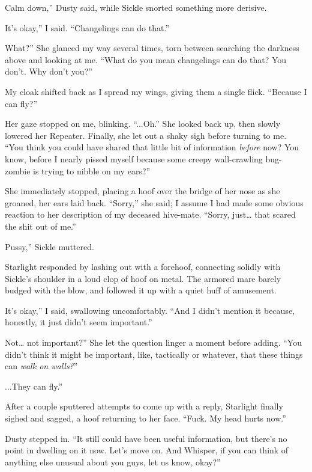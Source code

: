 \leavevmode{}Calm down,” Dusty said, while Sickle snorted something more derisive.

\leavevmode{}It’s okay,” I said. “Changelings can do that.”

\leavevmode{}What?” She glanced my way several times, torn between searching the darkness above and looking at me. “What do you mean changelings can do that? You don’t. Why don’t you?”

My cloak shifted back as I spread my wings, giving them a single flick. “Because I can fly?”

Her gaze stopped on me, blinking. “...Oh.” She looked back up, then slowly lowered her Repeater. Finally, she let out a shaky sigh before turning to me. “You think you could have shared that little bit of information \textit{before} now? You know, before I nearly pissed myself because some creepy wall-crawling bug-zombie is trying to nibble on my ears?”

She immediately stopped, placing a hoof over the bridge of her nose as she groaned, her ears laid back. “Sorry,” she said; I assume I had made some obvious reaction to her description of my deceased hive-mate. “Sorry, just… that scared the shit out of me.”

\leavevmode{}Pussy,” Sickle muttered.

Starlight responded by lashing out with a forehoof, connecting solidly with Sickle’s shoulder in a loud clop of hoof on metal. The armored mare barely budged with the blow, and followed it up with a quiet huff of amusement.

\leavevmode{}It’s okay,” I said, swallowing uncomfortably. “And I didn’t mention it because, honestly, it just didn’t seem important.”

\leavevmode{}Not… not important?” She let the question linger a moment before adding. “You didn’t think it might be important, like, tactically or whatever, that these things can \textit{walk on walls?}”

\leavevmode{}...They can fly.”

After a couple sputtered attempts to come up with a reply, Starlight finally sighed and sagged, a hoof returning to her face. “Fuck. My head hurts now.”

Dusty stepped in. “It still could have been useful information, but there’s no point in dwelling on it now. Let’s move on. And Whisper, if you can think of anything else unusual about you guys, let us know, okay?”

